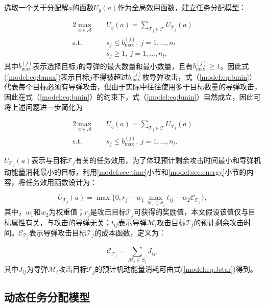 选取一个关于分配解$a$的函数$U_g(a)$作为全局效用函数，建立任务分配模型：

\begin{alignat}{2}
	\label{model:eq:globalU} \max_{a \in \mathcal{A}} \quad & U_g(a) = \sum_{\mathcal{T}_j \in \mathcal{T}} U_{\mathcal T_j}(a)\\
	\mbox{s.t.} \quad 
	\label{model:eq:bmax} & s_j \leq b_{\text{max}}^{(j)},\ j=1,\dots,n_t\\
	\label{model:eq:bmin}& s_j \geq 1,\ j=1,\dots,n_t,
\end{alignat}
其中$b_{\text{max}}^{(j)}$表示选择目标$j$的导弹的最大数量和最小数量，且有$b_{\text{max}}^{(j)} \geq 1$。因此式(\ref{model:eq:bmax})表示目标$j$不得被超过$b_{\text{max}}^{(j)}$枚导弹攻击，式（\ref{model:eq:bmin}）代表每个目标必须有导弹攻击，但由于实际中往往使用多于目标数量的导弹攻击，因此在式（\ref{model:eq:bmin}）的约束下，式（\ref{model:eq:bmin}）自然成立，因此可将上述问题进一步简化为

\begin{alignat}{2}
	\label{model:eq:simUg} \max_{a \in \mathcal{A}} \quad & U_g(a) = \sum_{\mathcal{T}_j \in \mathcal{T}} U_{\mathcal T_j}(a)\\
	\mbox{s.t.} \quad 
	\label{model:eq:simbmax} & s_j \leq b_{\text{max}}^{(j)},\ j=1,\dots,n_t.
\end{alignat}

$U_{\mathcal T_j}(a)$表示与目标$\mathcal{T}_j$有关的任务效用，为了体现预计剩余攻击时间最小和导弹机动能量消耗最小的目标，利用\ref{model:sec:time}小节和\ref{model:sec:energy}小节的内容，将任务效用函数设计为：

\begin{equation}
\label{model:eq:taskU}
	U_{\mathcal{T}_j}(a) = \max \{ 0, r_j - w_1 \max_{\mathcal{M}_i \in S_j} t_{ij} -
	w_2 \mathcal{C}_{\mathcal{T}_j} \},
\end{equation}
其中，$w_1$和$w_2$为权重值；$r_j$是攻击目标$\mathcal{T}_j$可获得的奖励值，本文假设该值仅与目标属性有关，与攻击的导弹无关；$t_{ij}$表示导弹$\mathcal{M}_i$攻击目标$\mathcal{T}_j$的预计剩余攻击时间。$\mathcal{C}_{\mathcal{T}_j}$表示导弹攻击目标$\mathcal{T}_j$的成本函数，定义为：

\begin{equation}
\label{model:eq:costU}
	\mathcal{C}_{\mathcal{T}_j} = \sum_{\mathcal{M}_i \in S_j} J_{ij},
\end{equation}
其中$J_{ij}$为导弹$\mathcal{M}_i$攻击目标$\mathcal{T}_j$的预计机动能量消耗可由式(\ref{model:eq:Jstar})得到。

\subsection{动态任务分配模型}
\label{model:dynamic_model}

